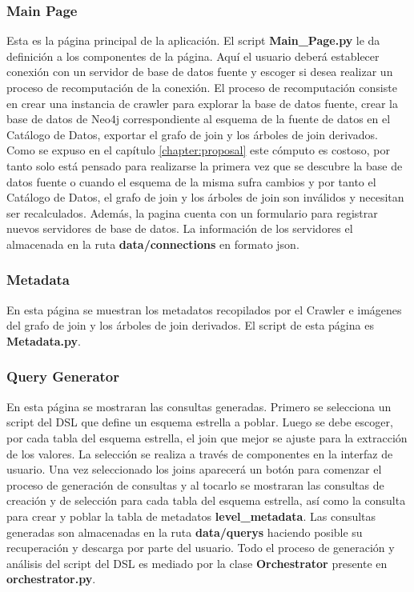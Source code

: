 \subsubsection{Main Page}

Esta es la página principal de la aplicación. El script \textbf{Main\_Page.py} le da definición 
a los componentes de la página. Aquí el usuario deber\'a establecer conexión con un servidor de 
base de datos fuente y escoger si desea realizar un proceso de recomputaci\'on de la conexión. El 
proceso de recomputaci\'on consiste en crear una instancia de crawler para explorar la base de datos 
fuente, crear la base de datos de Neo4j correspondiente al esquema de la fuente de datos en el Catálogo 
de Datos, exportar el grafo de join y los \'arboles de join derivados. Como se expuso en el capítulo 
\ref{chapter:proposal} este cómputo es costoso, por tanto solo est\'a pensado para realizarse la primera 
vez que se descubre la base de datos fuente o cuando el esquema de la misma sufra cambios y por tanto 
el Catálogo de Datos, el grafo de join y los \'arboles de join son inválidos y necesitan ser recalculados. 
Además, la pagina cuenta con un formulario para registrar nuevos servidores de base de datos. La información 
de los servidores el almacenada en la ruta \textbf{data/connections} en formato json.

\subsubsection{Metadata}

En esta página se muestran los metadatos recopilados por el Crawler e imágenes del 
grafo de join y los \'arboles de join derivados. El script de esta página es \textbf{Metadata.py}.

\subsubsection{Query Generator}

En esta página se mostraran las consultas generadas. Primero se selecciona un script del DSL que 
define un esquema estrella a poblar. Luego se debe escoger, por cada tabla del esquema estrella, el 
join que mejor se ajuste para la extracción de los valores. La selección se realiza a través 
de componentes en la interfaz de usuario. Una vez seleccionado los joins aparecer\'a un bot\'on 
para comenzar el proceso de generación de consultas y al tocarlo se mostraran las consultas 
de creación y de selección para cada tabla del esquema estrella, as\'i como la consulta 
para crear y poblar la tabla de metadatos \textbf{level\_metadata}. Las consultas generadas 
son almacenadas en la ruta \textbf{data/querys} haciendo posible su recuperación y descarga por parte del usuario. 
Todo el proceso de generación y análisis del script del DSL es mediado por la clase \textbf{Orchestrator} 
presente en \textbf{orchestrator.py}. 

